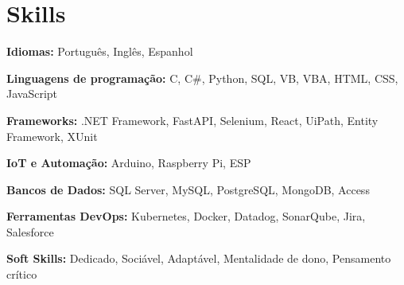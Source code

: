 \section{Skills}
	\begin{SkillHighlights} %
		\item \textbf{Idiomas:} Português, Inglês, Espanhol
		\item \textbf{Linguagens de programação:} C, C\#, Python, SQL, VB, VBA, HTML, CSS, JavaScript
		\item \textbf{Frameworks:} .NET Framework, FastAPI, Selenium, React, UiPath, Entity Framework, XUnit
		\item \textbf{IoT e Automação:} Arduino, Raspberry Pi, ESP
		
		\switchcolumn %

		\item \textbf{Bancos de Dados:} SQL Server, MySQL, PostgreSQL, MongoDB, Access
		\item \textbf{Ferramentas DevOps:} Kubernetes, Docker, Datadog, SonarQube, Jira, Salesforce
		\item \textbf{Soft Skills:} Dedicado, Sociável, Adaptável, Mentalidade de dono, Pensamento crítico
	\end{SkillHighlights}	